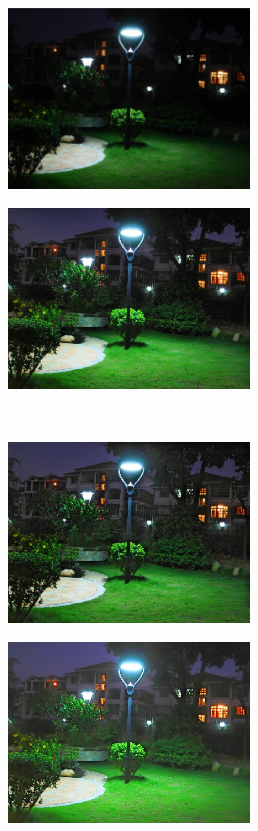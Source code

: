 \begin{figure}[htbp]
\centering
	\begin{minipage}[b]{0.49\hsize}
		\centering
		\includegraphics[width=64mm, height=48mm]{images/experiment/qualitative/comp2/2/input.eps}
		 \label{fig:qualitative/2/input}
	\end{minipage}
	\begin{minipage}[b]{0.49\hsize}
		\centering
		\includegraphics[width=64mm, height=48mm]{images/experiment/qualitative/comp2/2/srie.eps}
		 \label{fig:qualitative/2/srie}
	\end{minipage} \\
	\begin{minipage}[b]{0.49\hsize}
		\centering
		\includegraphics[width=64mm, height=48mm]{images/experiment/qualitative/comp2/2/wvm.eps}
		 \label{fig:qualitative/2/wvm}
	\end{minipage}
	\begin{minipage}[b]{0.49\hsize}
		\centering
		\includegraphics[width=64mm, height=48mm]{images/experiment/qualitative/comp2/2/rrm.eps}

\end{minipage}
\end{figure}
